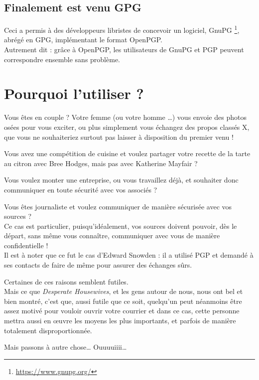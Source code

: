 \subsection{Finalement est venu GPG}\label{finalement-est-venu-gpg}

Ceci a permis à des développeurs libristes de concevoir un logiciel, GnuPG
\footnote{\url{https://www.gnupg.org/}}, abrégé en GPG, implémentant le format OpenPGP.\\Autrement dit : grâce à OpenPGP, les utilisateurs de
GnuPG et PGP peuvent correspondre ensemble sans problème.

\section{Pourquoi l'utiliser ?}\label{pourquoi-lutiliser}

Vous êtes en couple ? Votre femme (ou votre homme \ldots{}) vous envoie
des photos osées pour vous exciter, ou plus simplement vous échangez des
propos classés X, que vous ne souhaiteriez surtout pas laisser à
disposition du premier venu !

Vous avez une compétition de cuisine et voulez partager votre recette de la tarte au citron avec Bree Hodges, mais pas avec Katherine Mayfair ?

Vous voulez monter une entreprise, ou vous travaillez déjà, et souhaiter donc communiquer en toute sécurité avec vos associés ?

Vous êtes journaliste et voulez communiquer de manière sécurisée avec vos sources ?\\Ce cas est
particulier, puisqu'idéalement, vos sources doivent pouvoir, dès le départ, sans même vous connaître, communiquer avec vous de manière
confidentielle !\\Il est à noter que ce fut le cas d'Edward Snowden : il a utilisé PGP et demandé à ses contacts de faire de même pour assurer
des échanges sûrs.

Certaines de ces raisons semblent futiles.\\Mais ce que \emph{Desperate Housewives}, et les gens autour de nous, nous ont bel et bien montré,
c'est que, aussi futile que ce soit, quelqu'un peut néanmoins être assez motivé pour vouloir ouvrir votre courrier et dans ce cas, cette personne
mettra aussi en œuvre les moyens les plus importants, et parfois de manière totalement disproportionnée.

Mais passons à autre chose\ldots{}
Ouuuuiiii\ldots{}\\

